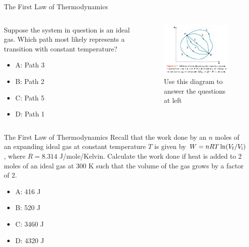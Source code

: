 \documentclass{beamer}
\begin{document}
\begin{frame}{The First Law of Thermodynamics}
\begin{columns}[T]
\begin{column}{0.5\textwidth}
\small Suppose the system in question is an ideal gas.  Which path most likely represents a transition with constant temperature?
\begin{itemize}
\item A: Path 3
\item B: Path 2
\item C: Path 5
\item D: Path 1
\end{itemize}
\end{column}
\begin{column}{0.5\textwidth}
\begin{figure}
\centering
\includegraphics[width=\textwidth]{figures/states1.png}
\caption{\label{fig:states4} Use this diagram to answer the questions at left}
\end{figure}
\end{column}
\end{columns}
\end{frame}

\begin{frame}{The First Law of Thermodynamics}
Recall that the work done by an $n$ moles of an expanding ideal gas at constant temperature $T$ is given by $W = nRT\ln(V_{\rm f}/V_{\rm i})$, where $R = 8.314$ J/mole/Kelvin.  Calculate the work done if heat is added to 2 moles of an ideal gas at 300 K such that the volume of the gas grows by a factor of 2.
\begin{itemize}
\item A: 416 J
\item B: 520 J
\item C: 3460 J
\item D: 4320 J
\end{itemize} 
\end{frame}
\end{document}
